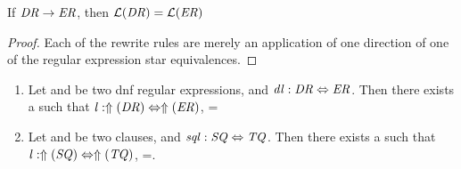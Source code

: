 \documentclass[numbers]{sigplanconf}
\begin{document}
\begin{lemma}
\label{lem:rrl}
If $\mathit{DR}\rightarrow\mathit{ER}$, then $\mathcal{L}(\mathit{DR})=\mathcal{L}(\mathit{ER})$
\end{lemma}
\begin{proof}
Each of the rewrite rules are merely an application of one direction of one of
the regular expression star equivalences.
\end{proof}

\begin{lemma}\leavevmode
\label{lem:dnfcal}
\begin{enumerate}
\item Let \DNFRegex{} and \DNFRegexAlt{} be two dnf regular expressions, and $\mathit{dl} : \mathit{DR} \Leftrightarrow \mathit{ER}$.  Then there exists a \Lens{} such that $\mathit{l} : \Uparrow(\mathit{DR}) \Leftrightarrow \Uparrow(\mathit{ER})$, \SemanticsOf{\Lens}=\SemanticsOf{\DNFLens}

\item Let \Sequence{} and \SequenceAlt{} be two clauses, and $\mathit{sql} : \mathit{SQ} \Leftrightarrow \mathit{TQ}$.  Then there exists a \Lens{} such that $\mathit{l} : \Uparrow(\mathit{SQ}) \Leftrightarrow \Uparrow(\mathit{TQ})$, \SemanticsOf{\Lens}=\SemanticsOf{\SequenceLens}.


\end{enumerate}
\end{lemma}
\end{document}
